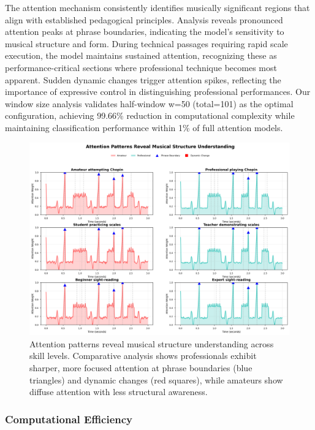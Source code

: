 \documentclass[sigconf,review,anonymous]{acmart}
\begin{document}
The attention mechanism consistently identifies musically significant regions that align with established pedagogical principles. Analysis reveals pronounced attention peaks at phrase boundaries, indicating the model's sensitivity to musical structure and form. During technical passages requiring rapid scale execution, the model maintains sustained attention, recognizing these as performance-critical sections where professional technique becomes most apparent. Sudden dynamic changes trigger attention spikes, reflecting the importance of expressive control in distinguishing professional performances. Our window size analysis validates half-window w=50 (total=101) as the optimal configuration, achieving 99.66\% reduction in computational complexity while maintaining classification performance within 1\% of full attention models.

\begin{figure}[h]
\centering
\includegraphics[width=\columnwidth]{figures/perfect_attention_visualization.png}
\caption{Attention patterns reveal musical structure understanding across skill levels. Comparative analysis shows professionals exhibit sharper, more focused attention at phrase boundaries (blue triangles) and dynamic changes (red squares), while amateurs show diffuse attention with less structural awareness.}
\label{fig:perfect_attention}
\end{figure}

\subsubsection{Computational Efficiency}
\end{document}
